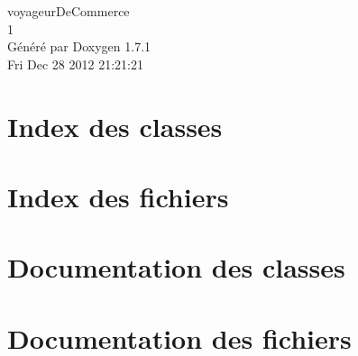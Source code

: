 \documentclass[a4paper]{book}
\begin{document}
\hypersetup{pageanchor=false}
\begin{titlepage}
\vspace*{7cm}
\begin{center}
{\Large voyageurDeCommerce \\[1ex]\large 1 }\\
\vspace*{1cm}
{\large Généré par Doxygen 1.7.1}\\
\vspace*{0.5cm}
{\small Fri Dec 28 2012 21:21:21}\\
\end{center}
\end{titlepage}
\clearemptydoublepage
{}
\tableofcontents
\clearemptydoublepage
{}
\hypersetup{pageanchor=true}
\chapter{Index des classes}

\chapter{Index des fichiers}

\chapter{Documentation des classes}





\chapter{Documentation des fichiers}








\printindex
\end{document}
